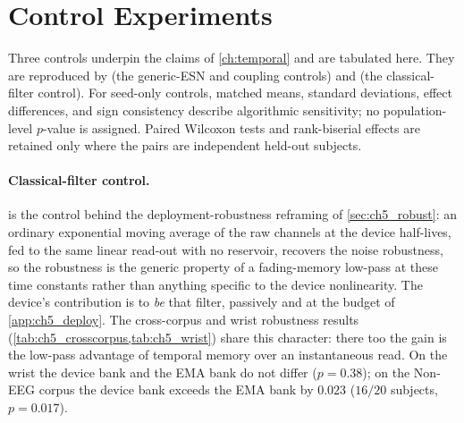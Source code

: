 \section{Control Experiments}\label{app:ch5_controls}

Three controls underpin the claims of \cref{ch:temporal} and are tabulated here.
They are reproduced by  (the generic-ESN and coupling
controls) and  (the classical-filter control). For
seed-only controls, matched means, standard deviations, effect differences, and
sign consistency describe algorithmic sensitivity; no population-level $p$-value is
assigned. Paired Wilcoxon tests and rank-biserial effects are retained only where the
pairs are independent held-out subjects.

\paragraph{Classical-filter control.}  is the control behind the
deployment-robustness reframing of \cref{sec:ch5_robust}: an ordinary exponential
moving average of the raw channels at the device half-lives, fed to the same linear
read-out with no reservoir, recovers the noise robustness, so the robustness is the
generic property of a fading-memory low-pass at these time constants rather than
anything specific to the device nonlinearity. The device's contribution is to \emph{be} that filter, passively and at
the budget of \cref{app:ch5_deploy}. The cross-corpus and wrist robustness results
(\cref{tab:ch5_crosscorpus,tab:ch5_wrist}) share this character: there too the gain
is the low-pass advantage of temporal memory over an instantaneous read. On the wrist
the device bank and the EMA bank do not differ ($p=0.38$); on the Non-EEG corpus the
device bank exceeds the EMA bank by $0.023$ ($16/20$ subjects, $p=0.017$).

